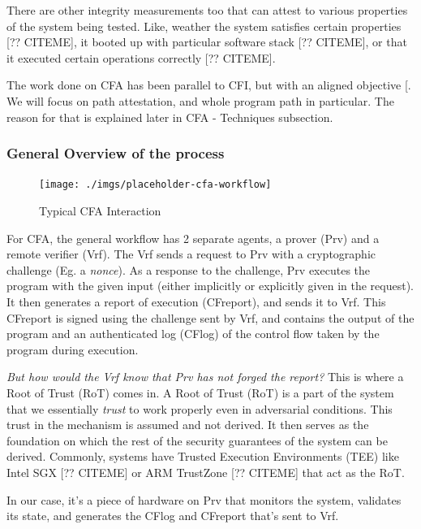 \documentclass[a4paper, nobind]{templates/ociamthesis}
\begin{document}
There are other integrity measurements too that can attest to various properties
of the system being tested.
Like, weather the system satisfies certain properties {[}?? CITEME{]}, it booted up
with particular software stack {[}?? CITEME{]}, or that it executed certain operations correctly {[}?? CITEME{]}.

The work done on CFA has been parallel to CFI, but with an aligned objective {[}\citeproc{ref-sok}{2}{]}.
We will focus on path attestation, and whole program path in particular.
The reason for that is explained later in CFA - Techniques subsection.

\subsubsection{General Overview of the process}\label{general-overview-of-the-process}

\begin{figure}[H]

{\centering \texttt{[image: ./imgs/placeholder-cfa-workflow]} 

}

\caption{Typical CFA Interaction}\label{fig:cfa-workflow}
\end{figure}

For CFA, the general workflow has 2 separate agents, a prover (Prv) and a remote verifier (Vrf).
The Vrf sends a request to Prv with a cryptographic challenge (Eg. a \emph{nonce}).
As a response to the challenge, Prv executes the program with the given
input (either implicitly or explicitly given in the request).
It then generates a report of execution (CFreport), and sends it to Vrf.
This CFreport is signed using the challenge sent by Vrf, and contains the output of the program and an
authenticated log (CFlog) of the control flow taken by the program during execution.

\emph{But how would the Vrf know that Prv has not forged the report?}
This is where a Root of Trust (RoT) comes in.
A Root of Trust (RoT) is a part of the system that we essentially \emph{trust} to work
properly even in adversarial conditions. This trust in the mechanism is assumed and not derived.
It then serves as the foundation on which the rest of the security guarantees
of the system can be derived. Commonly, systems have Trusted Execution Environments
(TEE) like Intel SGX {[}?? CITEME{]} or ARM TrustZone {[}?? CITEME{]} that act as the RoT.

In our case, it's a piece of hardware on Prv that monitors the system, validates its state,
and generates the CFlog and CFreport that's sent to Vrf.
\end{document}
